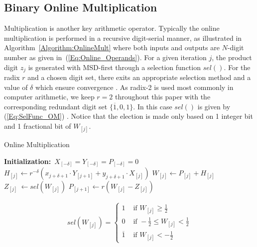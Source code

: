 \documentclass[conference]{IEEEtran}
\begin{document}
\subsection{Binary Online Multiplication}
Multiplication is another key arithmetic operator. Typically the online multiplication is performed in a recursive digit-serial manner, as illustrated in Algorithm~\ref{Algorithm:OnlineMult} \cite{Ercegovac_OnlineMult} where both inputs and outputs are $N$-digit number as given in~(\ref{Eq:Online_Operands}). For a given iteration $j$, the product digit $z_j$ is generated with MSD-first through a selection function $sel()$. For the radix $r$ and a chosen digit set, there exits an appropriate selection method and a value of $\delta$ which ensure convergence \cite{Ercegovac_OnlineMult}. As radix-2 is used most commonly in computer arithmetic, we keep $r=2$ throughout this paper with the corresponding redundant digit set $\{\overline{1},0,1\}$. In this case $sel()$ is given by (\ref{Eq:SelFunc_OM}) \cite{Oregon_OnlineNetwork}. Notice that the election is made only based on 1 integer bit and 1 fractional bit of $W_{[j]}$.

\begin{algorithm}[tbp]
  \caption{Online Multiplication}  \label{Algorithm:OnlineMult}
  \begin{algorithmic}[1]
   \State \textbf{Initialization:}~$X_{[-\delta]}=Y_{[-\delta]}=P_{[-\delta]}=0$\vspace{.5ex}
    \vspace{.5ex}
        \State $H_{[j]} \leftarrow r^{-\delta}\left(x_{j+\delta+1}\cdot Y_{[j+1]}+y_{j+\delta+1}\cdot X_{[j]}\right)$\vspace{.5ex}
        \State $W_{[j]} \leftarrow P_{[j]} + H_{[j]}$\vspace{.5ex}
        \State $Z_{[j]}~ \leftarrow sel(W_{[j]})$\vspace{.5ex}
        \State $P_{[j+1]} \leftarrow r\left(W_{[j]}-Z_{[j]}\right)$\vspace{.5ex}
    \EndFor
  \end{algorithmic}
\end{algorithm}

\begin{eqnarray}\label{Eq:SelFunc_OM}
  sel(W_{[j]})=\begin{cases}
    1 & \text{ if } W_{[j]} \geqslant \frac{1}{2} \\
    0 & \text{ if } -\frac{1}{2}\leqslant W_{[j]}<\frac{1}{2} \\
    \overline{1} & \text{ if } W_{[j]}<-\frac{1}{2}
  \end{cases}
\end{eqnarray}
\end{document}

